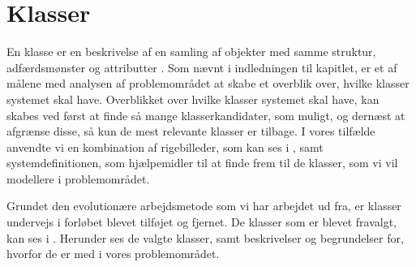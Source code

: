 \section{Klasser}
\label{sec:klasser}

En klasse er en beskrivelse af en samling af objekter med samme struktur, adfærdsmønster og attributter \cite[s. ~51]{ooad}. Som nævnt i indledningen til kapitlet, er et af målene med analysen af problemområdet at skabe et overblik over, hvilke klasser systemet skal have. Overblikket over hvilke klasser systemet skal have, kan skabes ved først at finde så mange klasserkandidater, som muligt, og dernæst at afgrænse disse, så kun de mest relevante klasser er tilbage. I vores tilfælde anvendte vi en kombination af rigebilleder, som kan ses i , samt systemdefinitionen, som hjælpemidler til at finde frem til de klasser, som vi vil modellere i problemområdet.

Grundet den evolutionære arbejdsmetode som vi har arbejdet ud fra, er klasser undervejs i forløbet blevet tilføjet og fjernet. De klasser som er blevet fravalgt, kan ses i . Herunder ses de valgte klasser, samt beskrivelser og begrundelser for, hvorfor de er med i vores problemområdet. 

